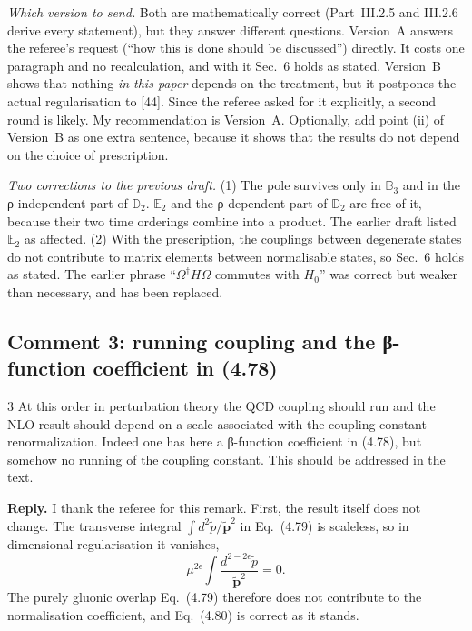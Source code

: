 \documentclass[11pt,a4paper]{article}
\newcommand{\eq}[1]{Eq.~(#1)}
\begin{document}
\begin{authornote}
\emph{Which version to send.} Both are mathematically correct (Part~III.2.5 and III.2.6 derive every statement), but they answer different questions. Version~A answers the referee's request (``how this is done should be discussed'') directly. It costs one paragraph and no recalculation, and with it Sec.~6 holds as stated. Version~B shows that nothing \emph{in this paper} depends on the treatment, but it postpones the actual regularisation to [44]. Since the referee asked for it explicitly, a second round is likely. My recommendation is Version~A. Optionally, add point (ii) of Version~B as one extra sentence, because it shows that the results do not depend on the choice of prescription.

\emph{Two corrections to the previous draft.} (1) The pole survives only in $\mathbb B_3$ and in the ρ-independent part of $\mathbb D_2$. $\mathbb E_2$ and the ρ-dependent part of $\mathbb D_2$ are free of it, because their two time orderings combine into a product. The earlier draft listed $\mathbb E_2$ as affected. (2) With the prescription, the couplings between degenerate states do not contribute to matrix elements between normalisable states, so Sec.~6 holds as stated. The earlier phrase ``$\Omega^\dagger H\Omega$ commutes with $H_0$'' was correct but weaker than necessary, and has been replaced.
\end{authornote}

\subsection*{Comment 3: running coupling and the β-function coefficient in (4.78)}

\begin{referee}{3}
At this order in perturbation theory the QCD coupling should run and the NLO result should depend on a scale associated with the coupling constant renormalization. Indeed one has here a β-function coefficient in (4.78), but somehow no running of the coupling constant. This should be addressed in the text.
\end{referee}

\textbf{Reply.} I thank the referee for this remark. First, the result itself does not change. The transverse integral $\int d^2\tilde p/\tilde{\mathbf p}^2$ in \eq{4.79} is scaleless, so in dimensional regularisation it vanishes,
\[
\mu^{2\epsilon}\int\frac{d^{2-2\epsilon}\tilde p}{\tilde{\mathbf p}^2}=0 .
\]
The purely gluonic overlap \eq{4.79} therefore does not contribute to the normalisation coefficient, and \eq{4.80} is correct as it stands.
\end{document}
